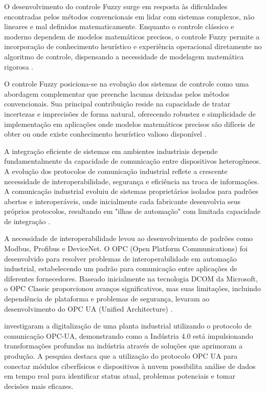 O desenvolvimento do controle Fuzzy surge em resposta às dificuldades encontradas pelos métodos convencionais em lidar com sistemas complexos, não lineares e mal definidos matematicamente. Enquanto o controle clássico e moderno dependem de modelos matemáticos precisos, o controle Fuzzy permite a incorporação de conhecimento heurístico e experiência operacional diretamente no algoritmo de controle, dispensando a necessidade de modelagem matemática rigorosa \cite{mamdani1975}.

O controle Fuzzy posiciona-se na evolução dos sistemas de controle como uma abordagem complementar que preenche lacunas deixadas pelos métodos convencionais. Sua principal contribuição reside na capacidade de tratar incertezas e imprecisões de forma natural, oferecendo robustez e simplicidade de implementação em aplicações onde modelos matemáticos precisos são difíceis de obter ou onde existe conhecimento heurístico valioso disponível \cite{ross2010}.

A integração eficiente de sistemas em ambientes industriais depende fundamentalmente da capacidade de comunicação entre dispositivos heterogêneos. A evolução dos protocolos de comunicação industrial reflete a crescente necessidade de interoperabilidade, segurança e eficiência na troca de informações. A comunicação industrial evoluiu de sistemas proprietários isolados para padrões abertos e interoperáveis, onde inicialmente cada fabricante desenvolvia seus próprios protocolos, resultando em "ilhas de automação" com limitada capacidade de integração \cite{stenerson2015}.

A necessidade de interoperabilidade levou ao desenvolvimento de padrões como Modbus, Profibus e DeviceNet. O OPC (Open Platform Communications) foi desenvolvido para resolver problemas de interoperabilidade em automação industrial, estabelecendo um padrão para comunicação entre aplicações de diferentes fornecedores. Baseado inicialmente na tecnologia DCOM da Microsoft, o OPC Classic proporcionou avanços significativos, mas suas limitações, incluindo dependência de plataforma e problemas de segurança, levaram ao desenvolvimento do OPC UA (Unified Architecture) \cite{mahnke2009}.

\cite{carvalho2023} investigaram a digitalização de uma planta industrial utilizando o protocolo de comunicação OPC-UA, demonstrando como a Indústria 4.0 está impulsionando transformações profundas na indústria através de soluções que aprimoram a produção. A pesquisa destaca que a utilização do protocolo OPC UA para conectar módulos ciberfísicos e dispositivos à nuvem possibilita análise de dados em tempo real para identificar status atual, problemas potenciais e tomar decisões mais eficazes.

